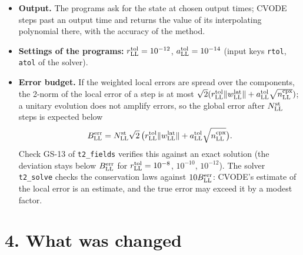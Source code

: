 \documentclass[
  10pt,
]{article}
\begin{document}
\begin{itemize}
  the same for the real and the imaginary part of a component, is given
  to CVODE by an error-weight function of \texttt{t2core::cvode}
  (\texttt{CVodeWFtolerances}). The standard weights of CVODE would
  weight the real part with its own modulus, which passes through zero
  twice in every period of an oscillation, and would force needlessly
  small steps.
\item
  \textbf{Output.} The programs ask for the state at chosen output
  times; CVODE steps past an output time and returns the value of its
  interpolating polynomial there, with the accuracy of the method.
\item
  \textbf{Settings of the programs:} \(r^{\rm tol}_{\rm LL}=10^{-12}\),
  \(a^{\rm tol}_{\rm LL}=10^{-14}\) (input keys \texttt{rtol},
  \texttt{atol} of the solver).
\item
  \textbf{Error budget.} If the weighted local errors are spread over
  the components, the 2-norm of the local error of a step is at most
  \(\sqrt2(r^{\rm tol}_{\rm LL}\lVert w^{\rm lat}_{\rm LL}\rVert+a^{\rm tol}_{\rm LL}\sqrt{n^{\rm cpx}_{\rm LL}})\);
  a unitary evolution does not amplify errors, so the global error after
  \(N^{\rm st}_{\rm LL}\) steps is expected below
  \[B^{\rm err}_{\rm LL}=N^{\rm st}_{\rm LL}\sqrt2\,\big(r^{\rm tol}_{\rm LL}\lVert w^{\rm lat}_{\rm LL}\rVert+a^{\rm tol}_{\rm LL}\sqrt{n^{\rm cpx}_{\rm LL}}\big).\]
  Check GS-13 of \texttt{t2\_fields} verifies this against an exact
  solution (the deviation stays below \(B^{\rm err}_{\rm LL}\) for
  \(r^{\rm tol}_{\rm LL}=10^{-8}\), \(10^{-10}\), \(10^{-12}\)). The
  solver \texttt{t2\_solve} checks the conservation laws against
  \(10B^{\rm err}_{\rm LL}\): CVODE's estimate of the local error is an
  estimate, and the true error may exceed it by a modest factor.
\end{itemize}

\hypertarget{what-was-changed}{%
\section{4. What was changed}\label{what-was-changed}}
\end{document}
